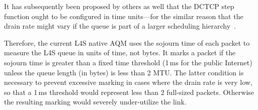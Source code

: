 It has subsequently been proposed by others as well that the DCTCP step function ought to be configured in time units---for the similar reason that the drain rate might vary if the queue is part of a larger scheduling hierarchy~\cite{Nichols12:CoDel, Bai16:MQ-ECN, Bai16:ECN_GPS}.

Therefore, the current L4S native AQM uses the sojourn time of each packet to measure the L4S queue in units of time, not bytes. It marks a packet if the sojourn time is greater than a fixed time threshold (1\,ms for the public Internet) unless the queue length (in bytes) is less than 2 MTU. The latter condition is necessary to prevent excessive marking in cases where the drain rate is very low, so that a 1\,ms threshold would represent less than 2 full-sized packets. Otherwise the resulting marking would severely under-utilize the link.




